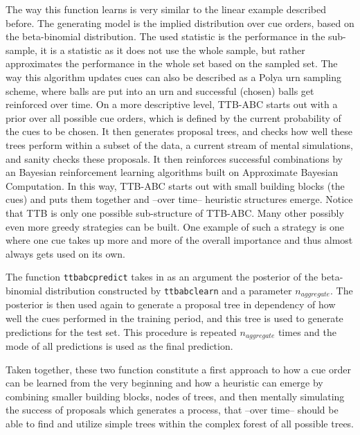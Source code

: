 \documentclass[a4paper,man, natbib]{apa6}
\begin{document}
The way this function learns is very similar to the linear example described before. The generating model is the implied distribution over cue orders, based on the beta-binomial distribution. The used statistic is the performance in the sub-sample, it is a statistic as it does not use the whole sample, but rather approximates the performance in the whole set based on the sampled set. The way this algorithm updates cues can also be described as a Polya urn sampling scheme, where balls are put into an urn and successful (chosen) balls get reinforced over time. On a more descriptive level, TTB-ABC starts out with a prior over all possible cue orders, which is defined by the current probability of the cues to be chosen. It then generates proposal trees, and checks how well these trees perform within a subset of the data, a current stream of mental simulations, and sanity checks these proposals. It then reinforces successful combinations by an Bayesian reinforcement learning algorithms \citep{poupart2010bayesian} built on Approximate Bayesian Computation. In this way, TTB-ABC starts out with small building blocks (the cues) and puts them together and --over time-- heuristic structures emerge. Notice that TTB is only one possible sub-structure of TTB-ABC. Many other possibly even more greedy strategies can be built. One example of such a strategy is one where one cue takes up more and more of the overall importance and thus almost always gets used on its own.

The function \texttt{ttbabcpredict} takes in as an argument the posterior of the beta-binomial distribution constructed by \texttt{ttbabclearn} and a parameter $n_{aggregate}$.  The posterior is then used again to generate a proposal tree in dependency of how well the cues performed in the training period, and this tree is used to generate predictions for the test set. This procedure is repeated  $n_{aggregate}$ times and the mode of all predictions is used as the final prediction.

Taken together, these two function constitute a first approach to how a cue order can be learned from the very beginning and how a heuristic can emerge by combining smaller building blocks, nodes of trees, and then mentally simulating the success of proposals which generates a process, that --over time-- should be able to find and utilize simple trees within the complex forest of all possible trees.  %

\end{document}
